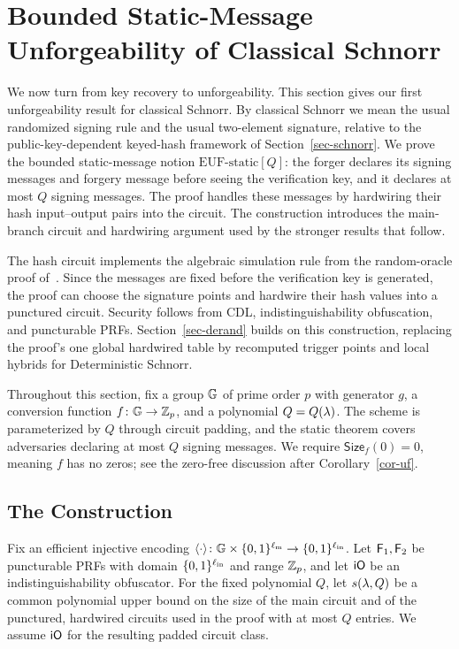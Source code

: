\section{Bounded Static-Message Unforgeability of Classical Schnorr} \label{sec-io-uf}

We now turn from key recovery to unforgeability. This section gives our first unforgeability result for classical Schnorr. By classical Schnorr we mean the usual randomized signing rule and the usual two-element signature, relative to the public-key-dependent keyed-hash framework of Section~\ref{sec-schnorr}. We prove the bounded static-message notion $\mathrm{EUF\text{-}static}[Q]$: the forger declares its signing messages and forgery message before seeing the verification key, and it declares at most $Q$ signing messages. The proof handles these messages by hardwiring their hash input--output pairs into the circuit. The construction introduces the main-branch circuit and hardwiring argument used by the stronger results that follow.

The hash circuit implements the algebraic simulation rule from the random-oracle proof of~\cite{C:CFOS25}. Since the messages are fixed before the verification key is generated, the proof can choose the signature points and hardwire their hash values into a punctured circuit. Security follows from CDL, indistinguishability obfuscation, and puncturable PRFs. Section~\ref{sec-derand} builds on this construction, replacing the proof's one global hardwired table by recomputed trigger points and local hybrids for Deterministic Schnorr.

Throughout this section, fix a group $\mathbb{G}$ of prime order $p$ with generator $g$, a conversion function $f \colon \mathbb{G} \to \mathbb Z_p$, and a polynomial $Q = Q(\lambda)$. The scheme is parameterized by $Q$ through circuit padding, and the static theorem covers adversaries declaring at most $Q$ signing messages. We require $\mathsf{Size}_f(0) = 0$, meaning $f$ has no zeros; see the zero-free discussion after Corollary~\ref{cor-uf}.

\subsection{The Construction} \label{sec-io-constr}

Fix an efficient injective encoding $\langle \cdot \rangle \colon \mathbb{G} \times \{0,1\}^{\ell_{\mathrm{m}}} \to \{0,1\}^{\ell_{\mathrm{in}}}$. Let $\mathsf{F}_1, \mathsf{F}_2$ be puncturable PRFs with domain $\{0,1\}^{\ell_{\mathrm{in}}}$ and range $\mathbb Z_p$, and let $\mathsf{iO}$ be an indistinguishability obfuscator. For the fixed polynomial $Q$, let $s(\lambda,Q)$ be a common polynomial upper bound on the size of the main circuit and of the punctured, hardwired circuits used in the proof with at most $Q$ entries. We assume $\mathsf{iO}$ for the resulting padded circuit class.

